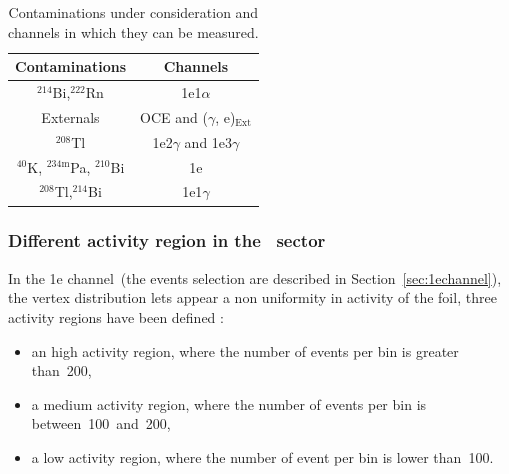 \documentclass[main.tex]{subfiles}
\begin{document}
\begin{table}[h!]
\centering
\begin{tabular}{c|c}
\toprule
Contaminations & Channels \\[0.1cm]
\midrule
$^{\text{214}}$Bi,$^{\text{222}}$Rn                    & 1e1$\alpha$                           \\[0.1cm]  
Externals                                              & OCE and ($\gamma$, e)$_{\text{Ext}}$  \\[0.1cm]
$^{\text{208}}$Tl                                      & 1e2$\gamma$  and 1e3$\gamma$          \\[0.1cm]
$^{\text{40}}$K, $^{\text{234m}}$Pa, $^{\text{210}}$Bi & 1e                                    \\[0.1cm]
$^{\text{208}}$Tl,$^{\text{214}}$Bi                    & 1e1$\gamma$                           \\[0.1cm] 
\bottomrule
\end{tabular}
\caption{Contaminations under consideration and channels in which they can be measured.}
\label{TableChannelBKG}
\end{table}


\bigskip


\subsubsection{Different activity region in the \Cd~sector}

\NI In the 1e channel~(the events selection are described in Section~\ref{sec:1echannel}), the vertex distribution lets appear a non uniformity in activity of the foil, three activity regions have been defined : 


\begin{itemize}
\item an high activity region, where the number of events per bin is greater than~200,
\item a medium activity region, where the number of events per bin is between~100~and~200,
\item a low activity region, where the number of event per bin is lower than~100.

\end{itemize}
\end{document}
